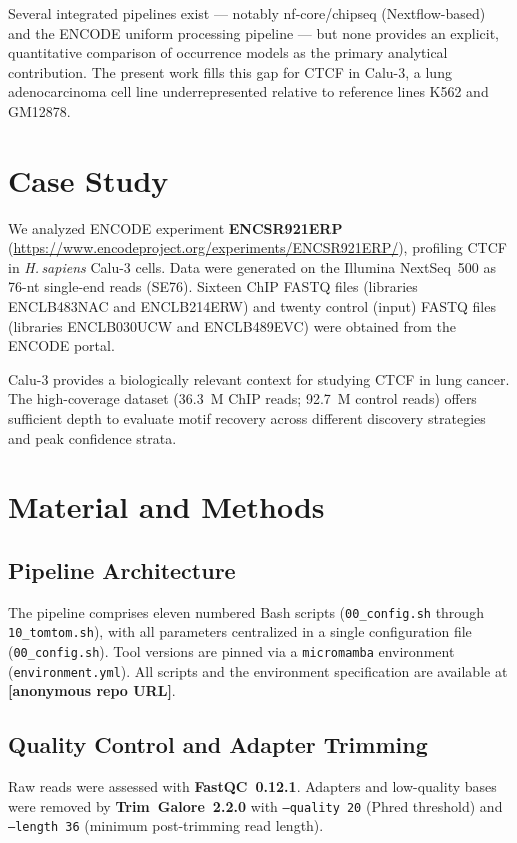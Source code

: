 \documentclass[12pt]{article}
\newcommand{\ph}[1]{\colorbox{yellow!50}{\textbf{[#1]}}}
\begin{document}
Several integrated pipelines exist --- notably nf-core/chipseq (Nextflow-based)
and the ENCODE uniform processing pipeline --- but none provides an explicit,
quantitative comparison of occurrence models as the primary analytical
contribution. The present work fills this gap for CTCF in Calu-3, a lung
adenocarcinoma cell line underrepresented relative to reference lines K562
and GM12878.

\section{Case Study}

We analyzed ENCODE experiment \textbf{ENCSR921ERP}
(\url{https://www.encodeproject.org/experiments/ENCSR921ERP/}), profiling CTCF
in \textit{H.\,sapiens} Calu-3 cells. Data were generated on the Illumina
NextSeq~500 as 76-nt single-end reads (SE76). Sixteen ChIP FASTQ files
(libraries ENCLB483NAC and ENCLB214ERW) and twenty control (input) FASTQ files
(libraries ENCLB030UCW and ENCLB489EVC) were obtained from the ENCODE portal.

Calu-3 provides a biologically relevant context for studying CTCF in lung
cancer. The high-coverage dataset (36.3~M ChIP reads; 92.7~M control reads)
offers sufficient depth to evaluate motif recovery across different discovery
strategies and peak confidence strata.

\section{Material and Methods}

\subsection{Pipeline Architecture}

The pipeline comprises eleven numbered Bash scripts (\texttt{00\_config.sh}
through \texttt{10\_tomtom.sh}), with all parameters centralized in a single
configuration file (\texttt{00\_config.sh}). Tool versions are pinned via a
\texttt{micromamba} environment (\texttt{environment.yml}). All scripts and
the environment specification are available at \ph{anonymous repo URL}.

\subsection{Quality Control and Adapter Trimming}

Raw reads were assessed with \textbf{FastQC~0.12.1}. Adapters and low-quality
bases were removed by \textbf{Trim~Galore~2.2.0} with \texttt{--quality~20}
(Phred threshold) and \texttt{--length~36} (minimum post-trimming read length).
\end{document}
